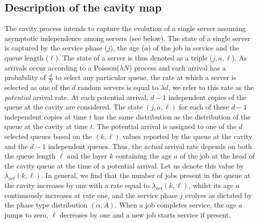 \documentclass[12pt]{report}
\begin{document}
\subsection{Description of the cavity map} \label{sec:cavity}
The cavity process intends to capture the evolution of a single server assuming
asymptotic independence among servers (see below). The state of a single server is captured
by the service phase ($j$), the age ($a$) of the job in service and the queue length ($\ell$). The state of a server is thus denoted as a triple ($j,a,\ell$). As arrivals occur according to a Poisson($\lambda N$) process and each arrival has a probability of $\frac{d}{N}$ to select any particular queue, the rate at which a server is selected as one of the $d$ random servers is equal to $\lambda d$, we refer to this rate as the {\it potential} arrival rate. At each potential arrival, $d-1$ independent copies of the queue at the cavity are considered. The state 
$(j,a,\ell)$ for each of these $d-1$ 
independent copies at time $t$ has the same distribution as the distribution of the
queue at the cavity at time $t$. The potential arrival is assigned to one of the $d$ selected queues based on the $(k,\ell)$ values reported by the 
queue at the cavity and the $d-1$ independent queues.  
Thus, the \textit{actual} arrival rate depends on both the queue length $\ell$ and the 
layer $k$ containing the age $a$ of the job at the head of the cavity queue at the time of a potential arrival. 
Let us denote this value by $\lambda_{act}(k,\ell)$. In general, we find that the number of jobs present in the queue at the cavity increases by one with a rate equal to $\lambda_{act}(k,\ell)$, whilst its age $a$ continuously increases at rate one, and the service phase $j$ evolves as dictated by the phase type distribution $(\alpha, A)$. When a job completes service, the age $a$ jumps to
zero, $\ell$ decreases by one and a new job starts service if present. 
\end{document}
